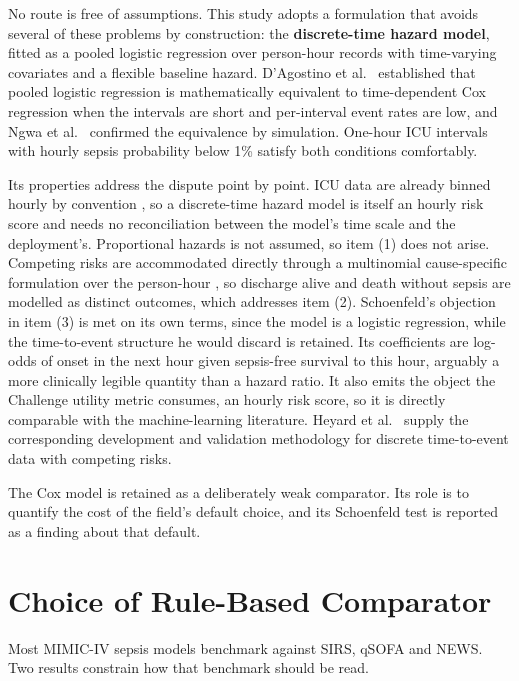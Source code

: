 No route is free of assumptions. This study adopts a formulation that avoids
several of these problems by construction: the \textbf{discrete-time hazard
model}, fitted as a pooled logistic
regression over person-hour records with time-varying covariates and a flexible
baseline hazard. D'Agostino et al.\ \cite{dagostino1990pooled} established that
pooled logistic regression is mathematically equivalent to time-dependent Cox
regression when the intervals are short and per-interval event rates are low,
and Ngwa et al.\ \cite{ngwa2016comparison} confirmed the equivalence by
simulation. One-hour ICU intervals with hourly sepsis probability below 1\%
satisfy both conditions comfortably.

Its properties address the dispute point by point. ICU data are already
binned hourly by convention \cite{reyna2020utility, nemati2018aise}, so a
discrete-time hazard model is itself an hourly risk score and needs no
reconciliation between the model's time scale and the deployment's.
Proportional hazards is not assumed, so item (1) does not arise. Competing
risks are accommodated directly through a multinomial cause-specific
formulation over the person-hour \cite{rescherigon2006competing,
heyard2019dynamic}, so discharge alive and death without sepsis are modelled as
distinct outcomes, which addresses item (2). Schoenfeld's objection in item (3)
is met on its own terms, since the model is a logistic regression, while the
time-to-event structure he would discard is retained. Its coefficients are
log-odds of onset in the next hour given sepsis-free survival to this hour,
arguably a more clinically legible quantity than a hazard ratio. It also emits
the object the Challenge utility metric consumes, an hourly risk score, so it
is directly comparable with the machine-learning literature. Heyard et al.\
\cite{heyard2019dynamic, heyard2020evaluation} supply the corresponding
development and validation methodology for discrete time-to-event data with
competing risks.

The Cox model is retained as a deliberately weak comparator. Its role is to
quantify the cost of the field's default choice, and its Schoenfeld test is
reported as a finding about that default.


\section{Choice of Rule-Based Comparator}
\label{sec:comparator_choice}

Most MIMIC-IV sepsis models benchmark against SIRS, qSOFA and NEWS. Two results
constrain how that benchmark should be read.

